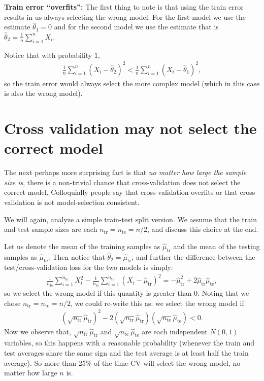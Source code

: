 \documentclass[twoside,12pt]{article}
\newcommand{\tr}{\text{tr}}
\newcommand{\te}{\text{te}}
\begin{document}
{\bf Train error ``overfits'': } The first thing to note is that using the train error results in us always selecting the wrong model. For the first model we use the estimate $\widehat{\theta}_1 = 0$ and for the second model we use the estimate that is $\widehat{\theta}_2 = \frac{1}{n} \sum_{i=1}^n X_i$.

Notice that with probability $1$, 
\begin{align*}
\frac{1}{n} \sum_{i=1}^n (X_i - \widehat{\theta}_2)^2 < \frac{1}{n} \sum_{i=1}^n (X_i - \widehat{\theta}_1)^2,
\end{align*}
so the train error would always select the more complex model (which in this case is also the wrong model).

\section{Cross validation may not select the correct model}
The next perhaps more surprising fact is that \emph{no matter how large the sample size is}, there is a non-trivial chance that cross-validation does not select the correct model. Colloquially people say that cross-validation overfits or that cross-validation is not model-selection consistent.

We will again, analyze a simple train-test split version. We assume that the train and test sample sizes are each $n_{\text{tr}} = n_{\text{te}} = n/2$, and discuss this choice at the end.

Let us denote the mean of the training samples as $\widehat{\mu}_{\tr}$ and the mean of the testing samples as $\widehat{\mu}_{\te}$. Then notice that $\widehat{\theta}_2 = \widehat{\mu}_{\tr}$, and further the difference between the test/cross-validation loss for the two models is simply:
\begin{align*}
\frac{1}{n_\te} \sum_{i=1}^{n_\te} X_i^2 - \frac{1}{n_\te} \sum_{i=1}^{n_\te} (X_i - \widehat{\mu}_{\tr})^2 =  - \widehat{\mu}_{\tr}^2 + 2 \widehat{\mu}_{\tr} \widehat{\mu}_{\te},
\end{align*}
so we select the wrong model if this quantity is greater than 0. Noting that we chose $n_{\text{tr}} = n_{\text{te}} = n/2$, we could re-write this as: we select the wrong model if
\begin{align*}
(\sqrt{n_{\tr}} \widehat{\mu}_{\tr})^2 - 2 (\sqrt{n_{\tr}}\widehat{\mu}_{\tr}) (\sqrt{n_{\te}} \widehat{\mu}_{\te}) < 0.
\end{align*}
Now we observe that, $\sqrt{n_{\tr}}  \widehat{\mu}_{\tr}$ and $\sqrt{n_\te} \widehat{\mu}_{\te}$ are each independent $N(0,1)$ variables, so this happens with a reasonable probability (whenever the train and test averages share the same sign and the test average is at least half the train average). So more than 25\% of the time CV will select the wrong model, no matter how large $n$ is.
\end{document}
